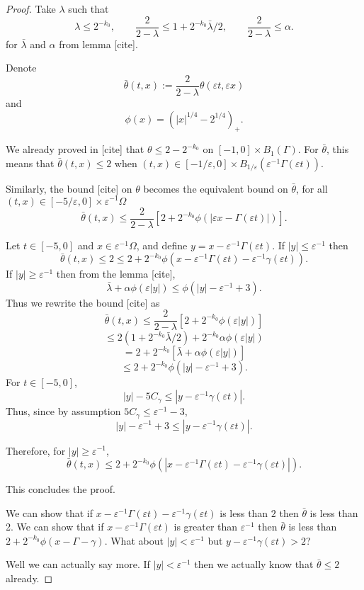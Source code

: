 \documentclass[11pt]{amsart}
\theoremstyle{remark}
\newcommand{\eps}{\varepsilon}
\newcommand{\paren}[1]{\left( #1 \right)}
\newcommand{\bracket}[1]{\left[ #1 \right]}
\newcommand{\n}{^{-1}}
\begin{document}
\begin{proof}
Take $\lambda$ such that
\[ \lambda \leq 2^{-k_0}, \qquad \frac{2}{2-\lambda} \leq 1 + 2^{-k_0} \bar{\lambda} / 2, \qquad \frac{2}{2-\lambda} \leq \alpha. \]
for $\bar{\lambda}$ and $\alpha$ from lemma [cite].  

Denote 
\[ \bar{\theta}(t,x) := \frac{2}{2-\lambda} \theta(\eps t, \eps x) \]
and
\[ \phi(x) = \paren{|x|^{1/4} - 2^{1/4}}_+. \]

We already proved in [cite] that $\theta \leq 2 - 2^{-k_0}$ on $[-1,0] \times B_1(\Gamma)$.  For $\bar{\theta}$, this means that $\bar{\theta}(t,x) \leq 2$ when $(t,x) \in [-1/\eps, 0] \times B_{1/\eps}(\eps\n \Gamma(\eps t))$.  

Similarly, the bound [cite] on $\theta$ becomes the equivalent bound on $\bar{\theta}$, for all $(t,x) \in [-5/\eps,0] \times \eps\n \Omega$
\[ \bar{\theta}(t,x) \leq \frac{2}{2-\lambda} \bracket{2 + 2^{-k_0} \phi(|\eps x - \Gamma(\eps t)|)}. \]

Let $t \in [-5,0]$ and $x \in \eps\n \Omega$, and define $y = x - \eps\n \Gamma(\eps t)$.  If $|y| \leq \eps\n$ then
\[ \bar{\theta}(t,x) \leq 2 \leq 2 + 2^{-k_0} \phi(x - \eps\n \Gamma(\eps t) - \eps\n \gamma(\eps t)). \]
If $|y| \geq \eps\n$ then from the lemma [cite], 
\[ \bar{\lambda} + \alpha \phi(\eps |y|) \leq \phi(|y| - \eps\n + 3). \]
Thus we rewrite the bound [cite] as
\[ \bar{\theta}(t,x) \leq \frac{2}{2-\lambda} \bracket{2 + 2^{-k_0} \phi(\eps |y|)} \]
\[ \leq 2(1 + 2^{-k_0} \bar{\lambda}/2) + 2^{-k_0} \alpha \phi(\eps |y|) \]
\[ = 2 + 2^{-k_0} \bracket{\bar{\lambda} + \alpha \phi(\eps |y|)} \]
\[ \leq 2 + 2^{-k_0} \phi(|y| - \eps\n + 3). \]
For $t \in [-5,0]$,
\[ |y| - 5 C_\gamma \leq |y - \eps\n\gamma(\eps t)|. \]
Thus, since by assumption $5 C_\gamma \leq \eps\n - 3$,
\[ |y| - \eps\n + 3 \leq |y-\eps\n\gamma(\eps t)|. \]

Therefore, for $|y| \geq \eps\n$,
\[ \bar{\theta}(t,x) \leq 2 + 2^{-k_0} \phi(|x - \eps\n\Gamma(\eps t) - \eps\n\gamma(\eps t)|). \]

This concludes the proof.  


We can show that if $x - \eps\n\Gamma(\eps t) - \eps\n\gamma(\eps t)$ is less than $2$ then $\bar{\theta}$ is less than 2.  We can show that if $x - \eps\n\Gamma(\eps t)$ is greater than $\eps\n$ then $\bar{\theta}$ is less than $2 + 2^{-k_0} \phi(x-\Gamma-\gamma)$.  What about $|y| < \eps\n$ but $y - \eps\n \gamma(\eps t) > 2$?  

Well we can actually say more.  If $|y| < \eps\n$ then we actually know that $\bar{\theta} \leq 2$ already.  



\end{proof}
\end{document}
